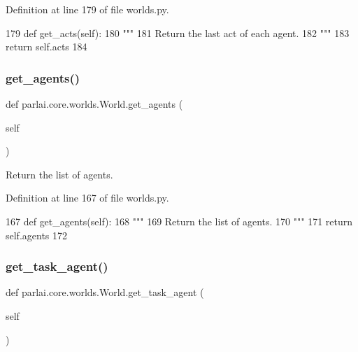 Definition at line 179 of file worlds.\+py.


\begin{DoxyCode}
179     \textcolor{keyword}{def }get\_acts(self):
180         \textcolor{stringliteral}{"""}
181 \textcolor{stringliteral}{        Return the last act of each agent.}
182 \textcolor{stringliteral}{        """}
183         \textcolor{keywordflow}{return} self.acts
184 
\end{DoxyCode}
\mbox{\label{classparlai_1_1core_1_1worlds_1_1World_a1c74e607d064c5823e56b23b21ce17f0}} 
\subsubsection{\texorpdfstring{get\+\_\+agents()}{get\_agents()}}
{\footnotesize\ttfamily def parlai.\+core.\+worlds.\+World.\+get\+\_\+agents (\begin{DoxyParamCaption}\item[{}]{self }\end{DoxyParamCaption})}

\begin{DoxyVerb}Return the list of agents.
\end{DoxyVerb}
 

Definition at line 167 of file worlds.\+py.


\begin{DoxyCode}
167     \textcolor{keyword}{def }get\_agents(self):
168         \textcolor{stringliteral}{"""}
169 \textcolor{stringliteral}{        Return the list of agents.}
170 \textcolor{stringliteral}{        """}
171         \textcolor{keywordflow}{return} self.agents
172 
\end{DoxyCode}
\mbox{\label{classparlai_1_1core_1_1worlds_1_1World_a25ccd7740aa992bb7055bf6549574a07}} 
\subsubsection{\texorpdfstring{get\+\_\+task\+\_\+agent()}{get\_task\_agent()}}
{\footnotesize\ttfamily def parlai.\+core.\+worlds.\+World.\+get\+\_\+task\+\_\+agent (\begin{DoxyParamCaption}\item[{}]{self }\end{DoxyParamCaption})}

